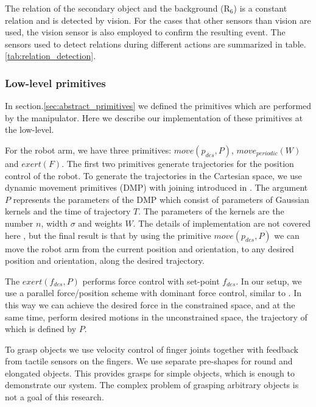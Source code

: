 The relation of the secondary object and the background ($\text{R}_6$) is a constant relation and is detected by vision.
For the cases that other sensors than vision are used, the vision sensor is also employed to confirm the resulting event.
The sensors used to detect relations during different actions are summarized in table.\ref{tab:relation_detection}.


\subsubsection{Low-level primitives}
\label{section_primitives}
In section.\ref{sec:abstract_primitives} we defined the primitives which are performed by the manipulator.
Here we describe our implementation of these primitives at the low-level.

For the robot arm, we have three primitives: $move(p_{des},P)$, $move_{periodic}(W)$ and $exert(F)$.
The first two primitives generate trajectories for the position control of the robot.
To generate the trajectories in the Cartesian space, we use dynamic movement primitives (DMP) with joining introduced in \cite{Kulvicius2012}.
The argument $P$ represents the parameters of the DMP which consist of parameters of Gaussian kernels and the time of trajectory $T$.
The parameters of the kernels are the number $n$, width $\sigma$ and weights $W$.
The details of implementation are not covered here , but the final result is that by using the primitive $move(p_{des},P)$
we can move the robot arm from the current position and orientation, to any desired position and orientation, along the desired trajectory.

The $exert(f_{des},P)$ performs force control with set-point $f_{des}$.
In our setup, we use a parallel force/position scheme with dominant force control, similar to \cite{chiaverini1993parallel}.
In this way we can achieve the desired force in the constrained space, and at the same time, perform desired motions in the unconstrained space,
the trajectory of which is defined by $P$.


To grasp objects we use velocity control of finger joints together with feedback from tactile sensors on the fingers.
We use separate pre-shapes for round and elongated objects.
This provides grasps for simple objects, which is enough to demonstrate our system.
The complex problem of grasping arbitrary objects is not a goal of this research.

